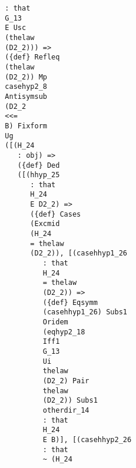 \documentclass[12pt]{article}
\begin{document}
\begin{verbatim}
                                        : that 
                                        G_13 
                                        E Usc 
                                        (thelaw 
                                        (D2_2))) => 
                                        ({def} Refleq 
                                        (thelaw 
                                        (D2_2)) Mp 
                                        casehyp2_8 
                                        Antisymsub 
                                        (D2_2 
                                        <<= 
                                        B) Fixform 
                                        Ug 
                                        ([(H_24 
                                           : obj) => 
                                           ({def} Ded 
                                           ([(hhyp_25 
                                              : that 
                                              H_24 
                                              E D2_2) => 
                                              ({def} Cases 
                                              (Excmid 
                                              (H_24 
                                              = thelaw 
                                              (D2_2)), [(casehhyp1_26 
                                                 : that 
                                                 H_24 
                                                 = thelaw 
                                                 (D2_2)) => 
                                                 ({def} Eqsymm 
                                                 (casehhyp1_26) Subs1 
                                                 Oridem 
                                                 (eqhyp2_18 
                                                 Iff1 
                                                 G_13 
                                                 Ui 
                                                 thelaw 
                                                 (D2_2) Pair 
                                                 thelaw 
                                                 (D2_2)) Subs1 
                                                 otherdir_14 
                                                 : that 
                                                 H_24 
                                                 E B)], [(casehhyp2_26 
                                                 : that 
                                                 ~ (H_24 

\end{verbatim}
\end{document}
